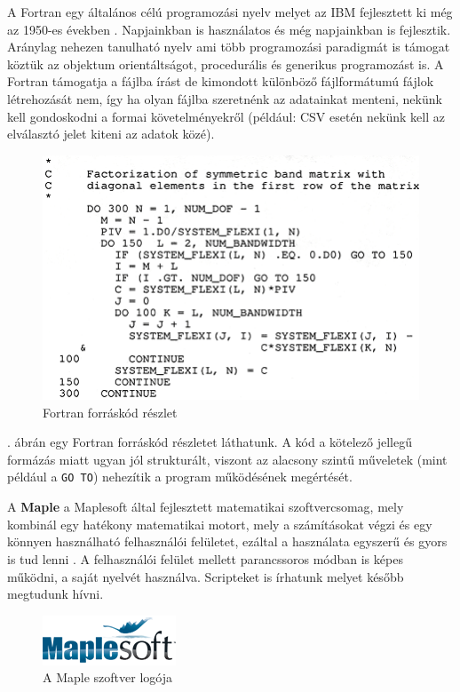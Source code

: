 
A Fortran egy általános célú programozási nyelv melyet az IBM
fejlesztett ki még az 1950-es években \cite{fortran}.
Napjainkban is használatos és még
napjainkban is fejlesztik. Aránylag nehezen tanulható nyelv ami több
programozási paradigmát is támogat köztük az objektum orientáltságot,
procedurális és generikus programozást is. A Fortran támogatja a fájlba
írást de kimondott különböző fájlformátumú fájlok létrehozását nem, így
ha olyan fájlba szeretnénk az adatainkat menteni, nekünk kell
gondoskodni a formai követelményekről (például: CSV esetén nekünk kell
az elválasztó jelet kiteni az adatok közé).

\begin{figure}[h!]
\centering
\includegraphics{img/FORTRAN_code_example.png}
\caption{Fortran forráskód részlet}
\label{fig:fortran}
\end{figure}

. ábrán egy Fortran forráskód részletet láthatunk. A kód a kötelező jellegű formázás miatt ugyan jól strukturált, viszont az alacsony szintű műveletek (mint például a \texttt{GO TO}) nehezítik a program működésének megértését.

\label{maple}

A \textbf{Maple} a Maplesoft által fejlesztett matematikai
szoftvercsomag, mely kombinál egy hatékony matematikai motort, mely a
számításokat végzi és egy könnyen használható felhasználói felületet,
ezáltal a használata egyszerű és gyors is tud lenni \cite{maple}.
A felhasználói
felület mellett parancssoros módban is képes működni, a saját nyelvét
használva. Scripteket is írhatunk melyet később megtudunk hívni.

\begin{figure}[h!]
\centering
\includegraphics{img/maple_logo.png}
\caption{A Maple szoftver logója}
\label{fig:maple-logo}
\end{figure}


